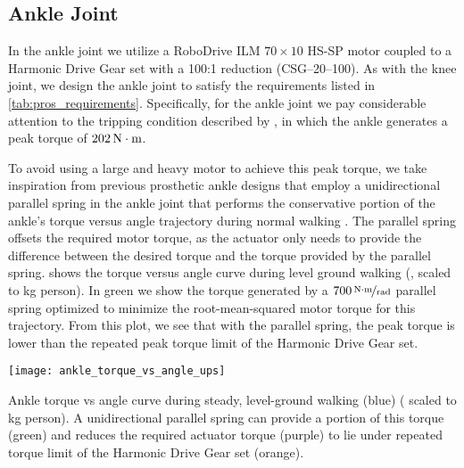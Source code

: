 \subsection{Ankle Joint}
In the ankle joint we utilize a RoboDrive ILM $70\times10$ HS-SP motor coupled
to a Harmonic Drive Gear set with a 100:1 reduction (CSG--20--100). As with the
knee joint, we design the ankle joint to satisfy the requirements listed in
\cref{tab:pros_requirements}. Specifically, for the ankle joint we pay
considerable attention to the tripping condition described by
\citet{pijnappels2005early}, in which the ankle generates a peak torque of
$\unit[202]{N \cdot m}$. 

To avoid using a large and heavy motor to achieve this peak torque, we take
inspiration from previous prosthetic ankle designs that employ a unidirectional
parallel spring in the ankle joint that performs the conservative portion of the
ankle's torque versus angle trajectory during normal walking
\citep{au2007biomechanical,au2008powered,sup2009preliminary,lawson2014robotic}.
The parallel spring offsets the required motor torque, as the actuator only
needs to provide the difference between the desired torque and the torque
provided by the parallel spring.  shows the
torque versus angle curve during level ground walking
(\citet{winter2009biomechanics}, scaled to \unit[80]{kg} person). In green we
show the torque generated by a $\unitfrac[700]{N \cdot m}{rad}$ parallel spring
optimized to minimize the root-mean-squared motor torque for this trajectory.
From this plot, we see that with the parallel spring, the peak torque is lower
than the repeated peak torque limit of the Harmonic Drive Gear set.

\begin{marginfigure}[-0in]
    \centering 
    \texttt{[image: ankle\_torque\_vs\_angle\_ups]}
    \caption{Ankle torque vs angle curve during steady, level-ground walking
    (blue) (\citet{winter2009biomechanics} scaled to \unit[80]{kg} person). A
    unidirectional parallel spring can provide a portion of this torque (green)
    and reduces the required actuator torque (purple) to lie under repeated
    torque limit of the Harmonic Drive Gear set (orange).
    }\label{fig:ankle_torque_vs_angle_ups}
\end{marginfigure}

